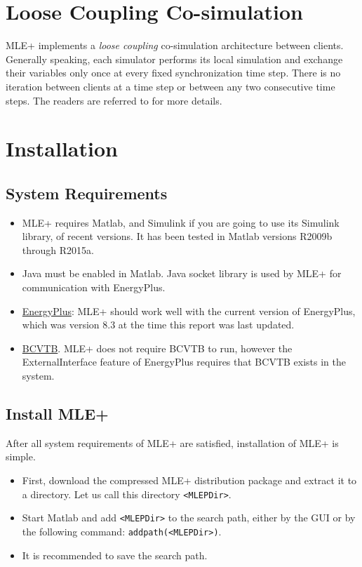 \documentclass[11pt,letter]{article}
\newcommand{\MLEP}{MLE+\xspace}
\begin{document}
\section{Loose Coupling Co-simulation}
\label{sec:co-simulation}

\MLEP implements a \emph{loose coupling} co-simulation architecture between clients.
Generally speaking, each simulator performs its local simulation and exchange their variables only once at every fixed synchronization time step.
There is no iteration between clients at a time step or between any two consecutive time steps.
The readers are referred to \cite{hensen1999comparison,zhai2005performance,trcka2007comparison} for more details.

\section{Installation}
\label{sec:install}
\subsection{System Requirements}
\label{sec:install:requirements}

\begin{itemize}
\item \MLEP requires Matlab, and Simulink if you are going to use its Simulink library, of recent versions.  It has been tested in Matlab versions R2009b through R2015a.
\item Java must be enabled in Matlab.  Java socket library is used by \MLEP
for communication with EnergyPlus.
\item \href{http://apps1.eere.energy.gov/buildings/energyplus/}{EnergyPlus}: \MLEP should work well with the current version of EnergyPlus, which was version 8.3 at the time this report was last updated.
\item \href{https://gaia.lbl.gov/bcvtb}{BCVTB}.  \MLEP does not require BCVTB to run, however the ExternalInterface feature of EnergyPlus requires that BCVTB exists in the system.
\end{itemize}

\subsection{Install \MLEP}
\label{sec:install:installation}

After all system requirements of \MLEP are satisfied, installation of \MLEP is simple.
\begin{itemize}
\item First, download the compressed \MLEP distribution package and extract
it to a directory.  Let us call this directory \verb+<MLEPDir>+.
\item Start Matlab and add \verb+<MLEPDir>+ to the search path, either by the GUI
or by the following command: \verb+addpath(<MLEPDir>)+.
\item It is recommended to save the search path.
\end{itemize}
\end{document}
